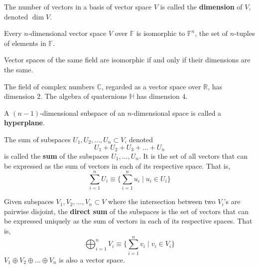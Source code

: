   \begin{definition}[Dimension]
    The number of vectors in a basis of vector space $V$ is called the \textbf{dimension} of $V$, denoted $\dim{V}$. 
  \end{definition}

  \begin{theorem}
    Every $n$-dimensional vector space $V$ over $\mathbb{F}$ is isomorphic to $\mathbb{F}^n$, the set of $n$-tuples of elements in $\mathbb{F}$. 
  \end{theorem}

  \begin{corollary}
    Vector spaces of the same field are isomorphic if and only if their dimensions are the same. 
  \end{corollary}

  \begin{example}
    The field of complex numbers $\mathbb{C}$, regarded as a vector space over $\mathbb{R}$, has dimension $2$. The algebra of quaternions $\mathbb{H}$ has dimension $4$. 
  \end{example}

  \begin{definition}[Hyperplane]
    A $(n - 1)$-dimensional subspace of an $n$-dimensional space is called a \textbf{hyperplane}. 
  \end{definition}

  \begin{definition}
    The sum of subspaces $U_1, U_2, ..., U_n \subset V$, denoted
    \begin{equation}
      U_1 + U_2 + U_3 + ... + U_n
    \end{equation}
    is called the \textbf{sum} of the subspaces $U_1, ..., U_n$. It is the set of all vectors that can be expressed as the sum of vectors in each of its respective space. That is, 
    \begin{equation}
      \sum_{i=1}^n U_i \equiv \Big\{ \sum_{i = 1}^n u_i \;|\; u_i \in U_i\Big\}
    \end{equation}
  \end{definition}

  \begin{definition}
    Given subspaces $V_1, V_2, ..., V_n \subset V$ where the intersection between two $V_i$'s are pairwise disjoint, the \textbf{direct sum} of the subspaces is the set of vectors that can be expressed uniquely as the sum of vectors in each of its respective spaces. That is, 
    \begin{equation}
      \bigoplus_{i=1}^n V_i \equiv \Big\{ \sum_{i=1}^n v_i \; | \; v_i \in V_i\Big\}
    \end{equation}
    $V_1 \oplus V_2 \oplus ... \oplus V_n$ is also a vector space. 
  \end{definition}

